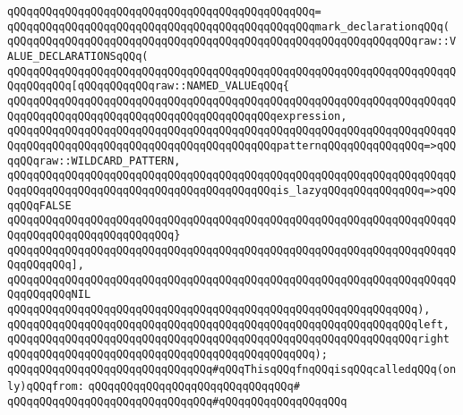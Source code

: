 \verb|qQQqqQQqqQQqqQQqqQQqqQQqqQQqqQQqqQQqqQQqqQQqqQQq=|\newline
\verb|qQQqqQQqqQQqqQQqqQQqqQQqqQQqqQQqqQQqqQQqqQQqqQQqmark_declarationqQQq(|\newline
\verb|qQQqqQQqqQQqqQQqqQQqqQQqqQQqqQQqqQQqqQQqqQQqqQQqqQQqqQQqqQQqqQQqraw::VALUE_DECLARATIONSqQQq(|\newline
\verb|qQQqqQQqqQQqqQQqqQQqqQQqqQQqqQQqqQQqqQQqqQQqqQQqqQQqqQQqqQQqqQQqqQQqqQQqqQQqqQQq[qQQqqQQqqQQqraw::NAMED_VALUEqQQq{|\newline
\verb|qQQqqQQqqQQqqQQqqQQqqQQqqQQqqQQqqQQqqQQqqQQqqQQqqQQqqQQqqQQqqQQqqQQqqQQqqQQqqQQqqQQqqQQqqQQqqQQqqQQqqQQqqQQqqQQqexpression,|\newline
\verb|qQQqqQQqqQQqqQQqqQQqqQQqqQQqqQQqqQQqqQQqqQQqqQQqqQQqqQQqqQQqqQQqqQQqqQQqqQQqqQQqqQQqqQQqqQQqqQQqqQQqqQQqqQQqqQQqpatternqQQqqQQqqQQqqQQq=>qQQqqQQqraw::WILDCARD_PATTERN,|\newline
\verb|qQQqqQQqqQQqqQQqqQQqqQQqqQQqqQQqqQQqqQQqqQQqqQQqqQQqqQQqqQQqqQQqqQQqqQQqqQQqqQQqqQQqqQQqqQQqqQQqqQQqqQQqqQQqqQQqis_lazyqQQqqQQqqQQqqQQq=>qQQqqQQqFALSE|\newline
\verb|qQQqqQQqqQQqqQQqqQQqqQQqqQQqqQQqqQQqqQQqqQQqqQQqqQQqqQQqqQQqqQQqqQQqqQQqqQQqqQQqqQQqqQQqqQQqqQQq}|\newline
\verb|qQQqqQQqqQQqqQQqqQQqqQQqqQQqqQQqqQQqqQQqqQQqqQQqqQQqqQQqqQQqqQQqqQQqqQQqqQQqqQQq],|\newline
\verb|qQQqqQQqqQQqqQQqqQQqqQQqqQQqqQQqqQQqqQQqqQQqqQQqqQQqqQQqqQQqqQQqqQQqqQQqqQQqqQQqNIL|\newline
\verb|qQQqqQQqqQQqqQQqqQQqqQQqqQQqqQQqqQQqqQQqqQQqqQQqqQQqqQQqqQQqqQQq),|\newline
\verb|qQQqqQQqqQQqqQQqqQQqqQQqqQQqqQQqqQQqqQQqqQQqqQQqqQQqqQQqqQQqqQQqleft,|\newline
\verb|qQQqqQQqqQQqqQQqqQQqqQQqqQQqqQQqqQQqqQQqqQQqqQQqqQQqqQQqqQQqqQQqright|\newline
\verb|qQQqqQQqqQQqqQQqqQQqqQQqqQQqqQQqqQQqqQQqqQQqqQQq);|\newline
\newline
\newline
\verb|qQQqqQQqqQQqqQQqqQQqqQQqqQQqqQQq#qQQqThisqQQqfnqQQqisqQQqcalledqQQq(only)qQQqfrom:|\newline
\verb|qQQqqQQqqQQqqQQqqQQqqQQqqQQqqQQq#|\newline
\verb|qQQqqQQqqQQqqQQqqQQqqQQqqQQqqQQq#qQQqqQQqqQQqqQQqqQQq|\newline
